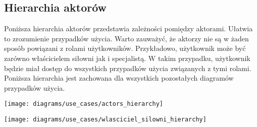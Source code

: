 \subsection{Hierarchia aktorów}\label{subsec:hierarchia-aktorow}

{Poniższa hierarchia aktorów przedstawia zależności pomiędzy aktorami.
Ułatwia to zrozumienie przypadków użycia. Warto zauważyć, że aktorzy
nie są w żaden sposób powiązani z rolami użytkowników.
Przykładowo, użytkownik może być zarówno właścicielem siłowni jak i
specjalistą. W takim przypadku, użytkownik będzie miał dostęp do
wszystkich przypadków użycia związanych z tymi rolami. Poniższa hierarchia
jest zachowana dla wszystkich pozostałych diagramów przypadków użycia.}

{\texttt{[image: diagrams/use\_cases/actors\_hierarchy]}}

{\texttt{[image: diagrams/use\_cases/wlasciciel\_silowni\_hierarchy]}}